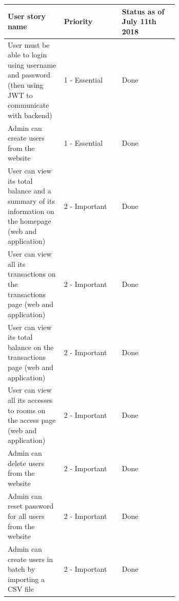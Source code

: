 \documentclass[11pt,a4paper]{report}
\begin{document}
\renewcommand*{\arraystretch}{1.5}
\begin{longtable}[c]{|p{0.33\linewidth}|l|p{0.33\linewidth}|}
\hline
\textbf{User story name}                                                                                                                       & \textbf{Priority} & \textbf{Status as of July 11th 2018}                \\ \hline
\endhead
%
User must be able to login using username and password (then using JWT to communicate with backend)                                            & 1 - Essential     & Done                                             \\ \hline
Admin can create users from the website                                                                                                        & 1 - Essential     & Done                                             \\ \hline
User can view its total balance and a summary of its information on the homepage (web and application)                                         & 2 - Important     & Done                                             \\ \hline
User can view all its transactions on the transactions page (web and application)                                                              & 2 - Important     & Done                                             \\ \hline
User can view its total balance on the transactions page (web and application)                                                                 & 2 - Important     & Done                                             \\ \hline
User can view all its accesses to rooms on the access page (web and application)                                                               & 2 - Important     & Done                                             \\ \hline
Admin can delete users from the website                                                                                                        & 2 - Important     & Done                                             \\ \hline
Admin can reset password for all users from the website                                                                                        & 2 - Important     & Done                                             \\ \hline
Admin can create users in batch by importing a CSV file                                                                                        & 2 - Important     & Done                                             \\ \hline

\end{longtable}
\end{document}
